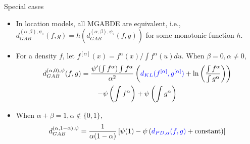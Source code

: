 \documentclass[10pt]{beamer}
\begin{document}
\begin{frame}{Special cases}
    \begin{itemize}
        \item In location models, all MGABDE are equivalent, i.e., $d_{GAB}^{(\alpha,\beta),\psi_1}(f, g) = h(d_{GAB}^{(\alpha,\beta),\psi_2}(f,g))$ for some monotonic function $h$.
        \pause
        \item For a density $f$, let $f^{[\alpha]}(x) = f^\alpha(x) / \int f^\alpha(u)du$. When $\beta = 0, \alpha \neq 0$,
        \begin{multline*}
            d_{GAB}^{(\alpha,0),\psi}(f, g)
            = \frac{\psi'(\int f^\alpha) \int f^\alpha}{\alpha^2}\left( \textcolor{blue}{d_{KL}(f^{[\alpha]}, g^{[\alpha]})} + \ln\left( \frac{\int f^\alpha}{\int g^\alpha} \right) \right)\\
            - \psi\left(\int f^\alpha\right) + \psi\left( \int g^\alpha \right)
        \end{multline*}
        \pause
        \item When $\alpha + \beta = 1, \alpha \notin \{0, 1\}$,
        \begin{equation*}
            d_{GAB}^{(\alpha,1-\alpha),\psi} = \frac{1}{\alpha(1-\alpha)} \left[ \psi(1) - \psi\left( \textcolor{blue}{d_{PD, \alpha}(f, g)} + \text{constant} \right) \right]
        \end{equation*}
    \end{itemize}
\end{frame}
\end{document}
